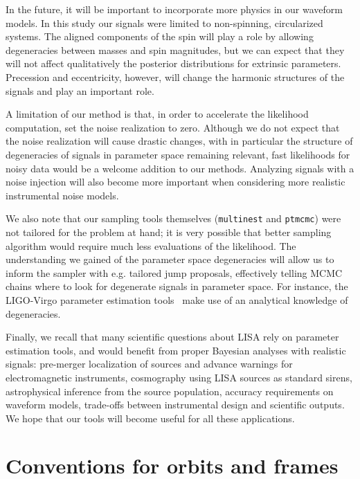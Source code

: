 \documentclass[aps,showpacs,twocolumn,prd,superscriptaddress,nofootinbib]{revtex4-1}
\begin{document}
In the future, it will be important to incorporate more physics in our waveform models. In this study our signals were limited to non-spinning, circularized systems. The aligned components of the spin will play a role by allowing degeneracies between masses and spin magnitudes, but we can expect that they will not affect qualitatively the posterior distributions for extrinsic parameters. Precession and eccentricity, however, will change the harmonic structures of the signals and play an important role.

A limitation of our method is that, in order to accelerate the likelihood computation, set the noise realization to zero. Although we do not expect that the noise realization will cause drastic changes, with in particular the structure of degeneracies of signals in parameter space remaining relevant, fast likelihoods for noisy data would be a welcome addition to our methods. Analyzing signals with a noise injection will also become more important when considering more realistic instrumental noise models.

We also note that our sampling tools themselves (\texttt{multinest} and \texttt{ptmcmc}) were not tailored for the problem at hand; it is very possible that better sampling algorithm would require much less evaluations of the likelihood. The understanding we gained of the parameter space degeneracies will allow us to inform the sampler with e.g. tailored jump proposals, effectively telling MCMC chains where to look for degenerate signals in parameter space. For instance, the LIGO-Virgo parameter estimation tools~\cite{Veitch+14} make use of an analytical knowledge of degeneracies.

Finally, we recall that many scientific questions about LISA rely on parameter estimation tools, and would benefit from proper Bayesian analyses with realistic signals: pre-merger localization of sources and advance warnings for electromagnetic instruments, cosmography using LISA sources as standard sirens, astrophysical inference from the source population, accuracy requirements on waveform models, trade-offs between instrumental design and scientific outputs. We hope that our tools will become useful for all these applications.



\appendix


\section{Conventions for orbits and frames}
\label{app:conventions}
\end{document}
